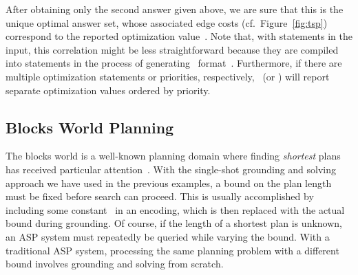 %
After obtaining only the second answer given above,
we are sure that this is the unique optimal answer set,
whose associated edge costs (cf.\ Figure~\ref{fig:tsp}) correspond to
the reported optimization value~.
Note that, with  statements in the input, this correlation
might be less straightforward because they are compiled into 
statements in the process of generating \smodels\ format~\cite{lparseManual}.
Furthermore, if there are multiple optimization statements or priorities, respectively,
\clasp\ (or \clingo) will report separate optimization values ordered by priority.

\subsection{Blocks World Planning}\label{subsec:ex:block}

The blocks world is a well-known planning domain
where finding \emph{shortest} plans has received particular attention~\cite{gupnau92a}.
With the single-shot grounding and solving approach we have used in the previous examples,
a bound on the plan length must be fixed before search can proceed.
This is usually accomplished by including some constant~
in an encoding, which is then replaced with the actual bound during grounding.
Of course, if the length of a shortest plan is unknown,
an ASP system must repeatedly be queried while varying the bound.
With a traditional ASP system, processing
the same planning problem with a different bound
involves grounding and solving from scratch.

